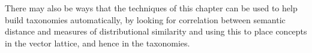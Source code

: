 There may also be ways that the techniques of this chapter can be used to help build taxonomies automatically, by looking for correlation between semantic distance and measures of distributional similarity and using this to place concepts in the vector lattice, and hence in the taxonomies.







% 
% 
 
% 